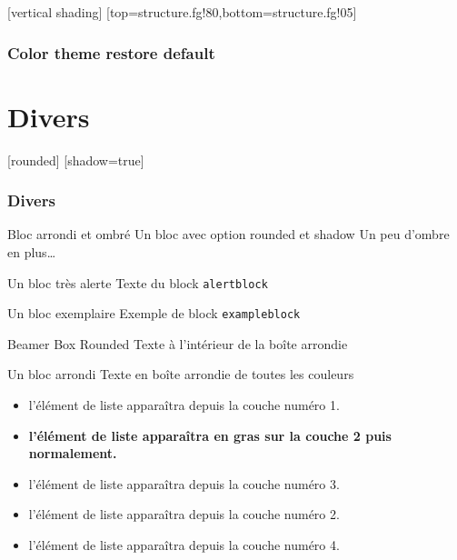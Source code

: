 \documentclass[utf8]{beamer}
\begin{document}
[vertical shading]%
[top=structure.fg!80,bottom=structure.fg!05]
\begin{frame}
\frametitle{Color theme restore default}
\end{frame}

\section{Divers}

[rounded]%
[shadow=true]
\begin{frame}
\frametitle{Divers}
\begin{block}{Bloc arrondi et ombré}
  Un bloc avec option rounded et shadow
  Un peu d'ombre en plus\dots
\end{block}

\begin{alertblock}{Un bloc très alerte}
  Texte du block \texttt{alertblock}
\end{alertblock}

\begin{exampleblock}{Un bloc exemplaire}
  Exemple de block \texttt{exampleblock}
\end{exampleblock}

\begin{beamerboxesrounded}%
      [lower=structure, %
       upper=block title,%
       shadow=true]%
      {Beamer Box Rounded}
    Texte à l'intérieur de la boîte arrondie
\end{beamerboxesrounded}

\begin{beamerboxesrounded}%
      [scheme=clair, shadow=true]%
      {Un bloc arrondi}
Texte en boîte arrondie de toutes les couleurs
\end{beamerboxesrounded}

\end{frame}

\begin{frame}
\begin{itemize}
  \item<1-> l'élément de liste apparaîtra depuis la couche numéro 1.
  \item<2-> \textbf<2>{l'élément de liste apparaîtra en gras
            sur la couche 2 puis normalement.}
  \item<3-> l'élément de liste apparaîtra depuis la couche numéro 3.
  \item<2-> l'élément de liste apparaîtra depuis la couche numéro 2.
  \item<4-> l'élément de liste apparaîtra depuis la couche numéro 4.
\end{itemize}
\end{frame}
\end{document}
